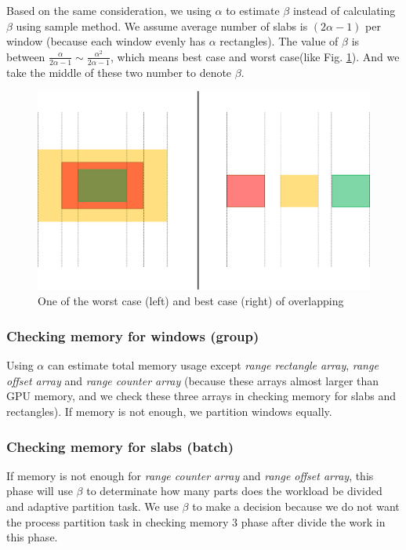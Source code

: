 Based on the same consideration, we using $\alpha$ to estimate $\beta$ instead of calculating $\beta$ using sample method. We assume average number of slabs is $(2\alpha - 1)$ per window (because each window evenly has $\alpha$ rectangles). The value of $\beta$ is between $\frac{\alpha}{2\alpha-1} \sim \frac{\alpha^2}{2\alpha-1}$, which means best case and worst case(like Fig. \ref{fig:fig_3_6}). And we take the middle of these two number to denote $\beta$.
\begin{figure}[h]
    \centering
    \includegraphics[scale=0.4]{image/fig_3_6}
    \caption{One of the worst case (left) and best case (right) of overlapping}
    \label{fig:fig_3_6}
\end{figure}

\subsubsection{Checking memory for windows (group)}
Using $\alpha$ can estimate total memory usage except \textit{range rectangle array}, \textit{range offset array} and \textit{range counter array} (because these arrays almost larger than GPU memory, and we check these three arrays in checking memory for slabs and rectangles). If memory is not enough, we partition windows equally.

\subsubsection{Checking memory for slabs (batch)}
If memory is not enough for \textit{range counter array} and \textit{range offset array}, this phase will use $\beta$ to determinate how many parts does the workload be divided and adaptive partition task. We use $\beta$ to make a decision because we do not want the process partition task in checking memory 3 phase after divide the work in this phase.

